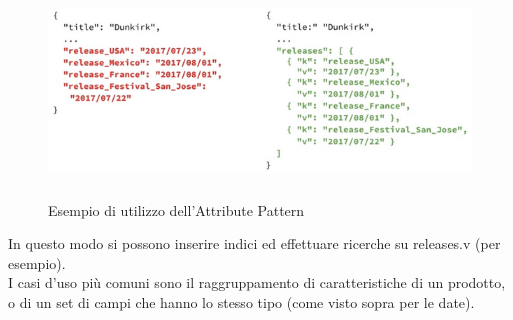 \begin{figure}[htbp]
\begin{center}
\includegraphics[height=15em]{immagini/attribute-pattern.png}
\caption{Esempio di utilizzo dell'Attribute Pattern}
\end{center}
\end{figure}

\noindent In questo modo si possono inserire indici ed effettuare ricerche su releases.v (per esempio).\\
I casi d'uso più comuni sono il raggruppamento di caratteristiche di un prodotto, o di un set di campi che hanno lo stesso tipo (come visto sopra per le date).

